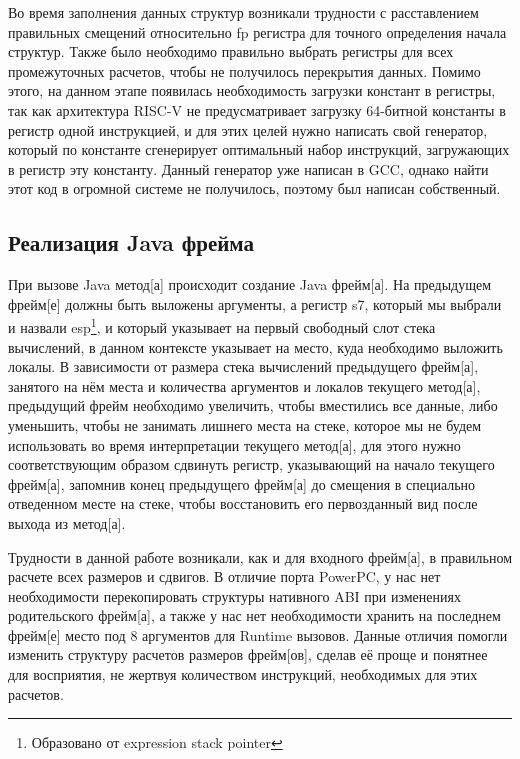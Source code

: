  
Во время заполнения данных структур возникали трудности с расставлением правильных смещений относительно fp регистра для точного определения начала структур. Также было необходимо правильно выбрать регистры для всех промежуточных расчетов, чтобы не получилось перекрытия данных. Помимо этого, на данном этапе появилась необходимость загрузки констант в регистры, так как архитектура RISC-V не предусматривает загрузку 64-битной константы в регистр одной инструкцией, и для этих целей нужно написать свой генератор, который по константе сгенерирует оптимальный набор инструкций, загружающих в регистр эту константу. Данный генератор уже написан в GCC, однако найти этот код в огромной системе не получилось, поэтому был написан собственный.





\subsection{Реализация Java фрейма}
При вызове Java \gls{метод}[а] происходит создание Java \gls{фрейм}[а]. На предыдущем \gls{фрейм}[е] должны быть выложены аргументы, а регистр s7, который мы выбрали и назвали esp\footnote{Образовано от expression stack pointer}, и который указывает на первый свободный слот стека вычислений, в данном контексте указывает на место, куда необходимо выложить локалы. В зависимости от размера стека вычислений предыдущего \gls{фрейм}[а], занятого на нём места и количества аргументов и локалов текущего \gls{метод}[а], предыдущий \gls{фрейм} необходимо увеличить, чтобы вместились все данные, либо уменьшить, чтобы не занимать лишнего места на стеке, которое мы не будем использовать во время интерпретации текущего \gls{метод}[а], для этого нужно соответствующим образом сдвинуть регистр, указывающий на начало текущего \gls{фрейм}[а], запомнив конец предыдущего \gls{фрейм}[а] до смещения в специально отведенном месте на стеке, чтобы восстановить его первозданный вид после выхода из \gls{метод}[а].

Трудности в данной работе возникали, как и для входного \gls{фрейм}[а], в правильном расчете всех размеров и сдвигов. В отличие порта PowerPC, у нас нет необходимости перекопировать структуры нативного ABI при изменениях родительского \gls{фрейм}[а], а также у нас нет необходимости хранить на последнем \gls{фрейм}[е] место под 8 аргументов для Runtime вызовов. Данные отличия помогли изменить структуру расчетов размеров \gls{фрейм}[ов], сделав её проще и понятнее для восприятия, не жертвуя количеством инструкций, необходимых для этих расчетов.

